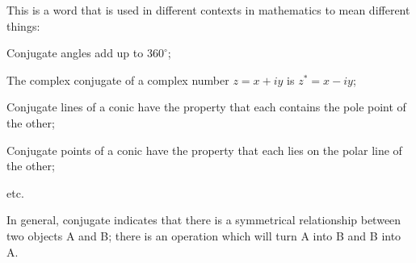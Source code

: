 This is a word that is used in different contexts in mathematics to mean different things:
\par
Conjugate angles add up to $360^{\circ}$;
\par
The complex conjugate of a complex number $z = x+iy$ is $z^* = x-iy$;
\par
Conjugate lines of a conic have the property that each contains the pole point of the other;
\par
Conjugate points of a conic have the property that each lies on the polar line of the other;
\par
etc.
\par
In general, conjugate indicates that there is a symmetrical relationship between two objects A and B; there is an operation which will turn A into B and B into A.
